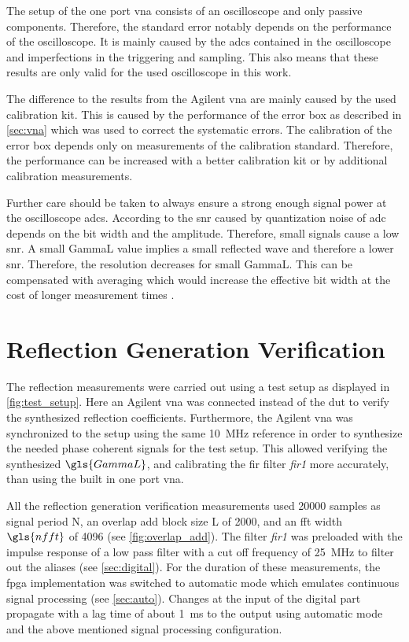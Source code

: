 \documentclass[12pt,a4paper,parskip=full,abstract=true,BCOR=12mm]{scrreprt}
\def\device#1{\mbox{\textit{#1}}}
\begin{document}
The setup of the one port \gls{vna} consists of an oscilloscope and only passive components.
Therefore, the standard error notably depends on the performance of the oscilloscope. It is
mainly caused by the \glspl{adc} contained in the oscilloscope and imperfections in the
triggering and sampling. This also means that these results are only valid for the
used oscilloscope in this work.

The difference to the results from the Agilent \gls{vna} are mainly caused by the
used calibration kit. This is caused by the performance of the error box as described in
\cref{sec:vna} which was used to correct the systematic errors. The calibration of the error
box depends only on measurements of the calibration standard. Therefore, the performance can
be increased with a better calibration kit or by additional calibration measurements.

Further care should be taken to always ensure a strong enough signal power at the
oscilloscope \glspl{adc}. According to \cite{Oppenheim} the \gls{snr} caused by quantization
noise of \gls{adc} depends on the bit width and the amplitude. Therefore, small signals cause
a low \gls{snr}. A small \gls{GammaL} value implies a small reflected wave and therefore a
lower \gls{snr}. Therefore, the resolution decreases for small \gls{GammaL}. This can
be compensated with averaging which would increase the effective bit width at the cost
of longer measurement times \cite{ad_mt004}.


\section{Reflection Generation Verification}
\label{sec:reflection}

The reflection measurements were carried out using a test setup as displayed in \cref{fig:test_setup}.
Here an Agilent \gls{vna} was connected instead of the \gls{dut} to verify the synthesized reflection
coefficients. Furthermore, the Agilent \gls{vna} was synchronized to the setup using the same
\SI{10}{\mega\hertz} reference in order to synthesize the needed phase coherent
signals for the test setup. This allowed verifying the synthesized $\gls{GammaL}$, and
calibrating the \gls{fir} filter \device{fir1} more accurately, than using the built
in one port \gls{vna}.

All the reflection generation verification measurements used \num{20000} samples as signal period \gls{N},
an overlap add block size \gls{L} of \num{2000}, and an \gls{fft} width $\gls{nfft}$ of \num{4096} (see
\cref{fig:overlap_add}). The filter \device{fir1} was preloaded with the
impulse response of a low pass filter with a cut off frequency of \SI{25}{\mega\hertz} to
filter out the aliases (see \cref{sec:digital}). For the duration of these measurements,
the \gls{fpga} implementation was switched to automatic mode which emulates continuous
signal processing (see \cref{sec:auto}). Changes at the input of the digital part propagate
with a lag time of about \SI{1}{\milli\second} to the output using automatic mode and the
above mentioned signal processing configuration.
\end{document}
